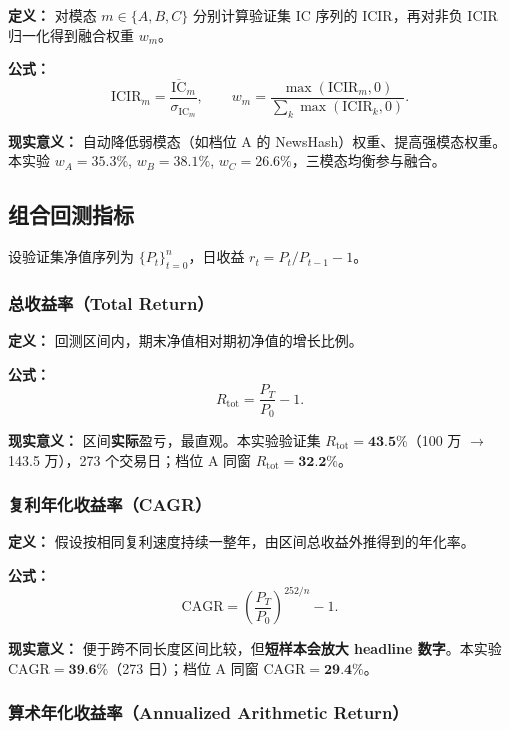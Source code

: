 \documentclass[UTF8,a4paper,12pt]{ctexart}
\begin{document}
\textbf{定义：} 对模态 $m\in\{A,B,C\}$ 分别计算验证集 IC 序列的 ICIR，再对非负 ICIR 归一化得到融合权重 $w_m$。

\textbf{公式：}
\begin{equation}
  \mathrm{ICIR}_m = \frac{\overline{\mathrm{IC}}_m}{\sigma_{\mathrm{IC}_m}},
  \qquad
  w_m = \frac{\max(\mathrm{ICIR}_m,0)}{\sum_k \max(\mathrm{ICIR}_k,0)}.
\end{equation}

\textbf{现实意义：} 自动降低弱模态（如档位 A 的 NewsHash）权重、提高强模态权重。本实验 $w_A=35.3\%$, $w_B=38.1\%$, $w_C=26.6\%$，三模态均衡参与融合。

\subsection{组合回测指标}

设验证集净值序列为 $\{P_t\}_{t=0}^{n}$，日收益 $r_t=P_t/P_{t-1}-1$。

\subsubsection{总收益率（Total Return）}

\textbf{定义：} 回测区间内，期末净值相对期初净值的增长比例。

\textbf{公式：}
\begin{equation}
  R_{\mathrm{tot}} = \frac{P_T}{P_0} - 1.
\end{equation}

\textbf{现实意义：} 区间\textbf{实际}盈亏，最直观。本实验验证集 $R_{\mathrm{tot}}=\textbf{43.5\%}$（100 万 $\to$ 143.5 万），273 个交易日；档位 A 同窗 $R_{\mathrm{tot}}=\textbf{32.2\%}$。

\subsubsection{复利年化收益率（CAGR）}

\textbf{定义：} 假设按相同复利速度持续一整年，由区间总收益外推得到的年化率。

\textbf{公式：}
\begin{equation}
  \mathrm{CAGR} = \left(\frac{P_T}{P_0}\right)^{252/n} - 1.
\end{equation}

\textbf{现实意义：} 便于跨不同长度区间比较，但\textbf{短样本会放大 headline 数字}。本实验 $\mathrm{CAGR}=\textbf{39.6\%}$（273 日）；档位 A 同窗 $\mathrm{CAGR}=\textbf{29.4\%}$。

\subsubsection{算术年化收益率（Annualized Arithmetic Return）}
\end{document}
